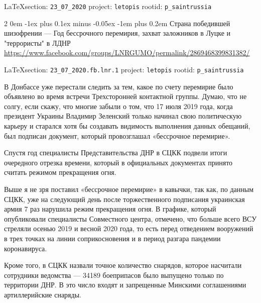 \documentclass[a4paper,11pt]{extreport}
\makeatletter
\renewcommand\subsection{%
  \clearpage
    \@startsection{subsection}%
    {2}%
    {0em}%
    {-1ex plus 0.1ex minus -0.05ex}%
    {-1em plus 0.2em}%
    {\scshape\bfseries\Large}%
}
\makeatother
\begin{document}
\vspace{0.5cm}
{\small\LaTeX section: \verb|23_07_2020| project: \verb|letopis| rootid: \verb|p_saintrussia|}
\vspace{0.5cm}

 
 
\subsection{Страна победившей шизофрении --- Год бессрочного перемирия, захват заложников в Луцке и "террористы" в ЛДНР}
\label{sec:23_07_2020.fb.lnr.1}
\url{https://www.facebook.com/groups/LNRGUMO/permalink/2869468399831382/}
  
\vspace{0.5cm}
{\small\LaTeX section: \verb|23_07_2020.fb.lnr.1| project: \verb|letopis| rootid: \verb|p_saintrussia|}
\vspace{0.5cm}


В Донбассе уже перестали следить за тем, какое по счету перемирие было
объявлено во время встречи Трехсторонней контактной группы. Думаю, что не
солгу, если скажу, что многие забыли о том, что 17 июля 2019 года, когда
президент Украины Владимир Зеленский только начинал свою политическую карьеру и
старался хотя бы создавать видимость выполнения данных обещаний, был подписан
документ, который провозглашал «бессрочное перемирие».

Спустя год специалисты Представительства ДНР в СЦКК подвели итоги очередного
отрезка времени, который в официальных документах принято считать режимом
прекращения огня.

Выше я не зря поставил «бессрочное перемирие» в кавычки, так как, по данным
СЦКК, уже на следующий день после торжественного подписания украинская армия 7
раз нарушила режим прекращения огня. В графике, который опубликовали
специалисты Совместного центра, отмечено, что больше всего ВСУ стреляли осенью
2019 и весной 2020 года, то есть перед отведением вооружений в трех точках на
линии соприкосновения и в период разгара пандемии коронавируса.

Кроме того, в СЦКК назвали точное количество снарядов, которое насчитали
сотрудники ведомства --- 34189 боеприпасов было выпущено только по территории
ДНР. В это число входят и запрещенные Минскими соглашениями артиллерийские
снаряды.
\end{document}
